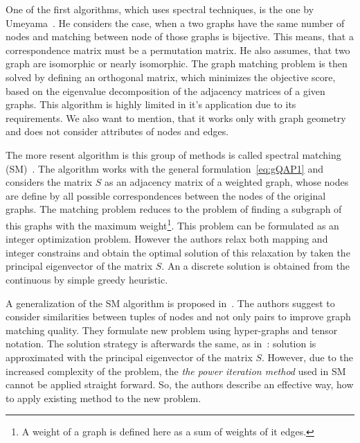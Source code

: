 One of the first algorithms, which uses spectral techniques, is the one by Umeyama~\cite{Umeyam1988}. He considers the case, when a two graphs have the same number of nodes and matching between node of those graphs is bijective. This means, that a correspondence matrix must be a permutation matrix. He also assumes, that two graph are isomorphic or nearly isomorphic. The graph matching problem is then solved by defining an orthogonal matrix, which minimizes the objective score, based on the eigenvalue decomposition of the adjacency matrices of a given graphs. This algorithm is highly limited in it's application due to its requirements. We also want to mention, that it works only with graph geometry and does not consider attributes of nodes and edges.

The more resent algorithm is this group of methods is called spectral matching (SM)~\cite{Leordeanu2005_SM}. The algorithm works with the general formulation~\eqref{eq:gQAP1} and considers the matrix $S$ as an adjacency matrix of a weighted graph, whose nodes are define by all possible correspondences between the nodes of the original graphs. The matching problem reduces to the problem of finding a subgraph of this graphs with the maximum weight\footnote{A weight of a graph is defined here as a sum of weights of it edges.}. This problem can be formulated as an integer optimization problem. However the authors relax both mapping and integer constrains and obtain the optimal solution of this relaxation by taken the principal eigenvector of the matrix $S$. An a discrete solution is obtained from the continuous by simple greedy heuristic. 

A generalization of the SM algorithm is proposed in~\cite{Duchenne2011}. The authors suggest to consider similarities between tuples of nodes and not only pairs to improve graph matching quality. They formulate new problem using hyper-graphs and tensor notation. The solution strategy is afterwards the same, as in~\cite{Leordeanu2005_SM}: solution is approximated with the principal eigenvector of the matrix $S$. However, due to the increased complexity of the problem, the \emph{the power iteration method} used in SM cannot be applied straight forward. So, the authors describe an effective way, how to apply existing method to the new problem.

